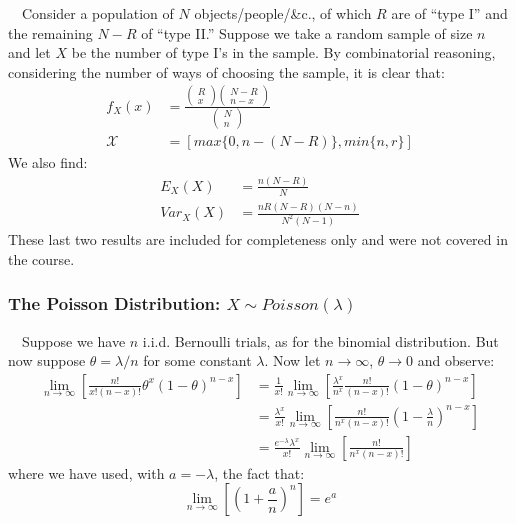 \documentclass[12pt,a4paper]{article}
\begin{document}
$\quad$Consider a population of $N$ objects/people/\&c., of which $R$ are of ``type I'' and the remaining $N-R$ of ``type II.'' Suppose we take a random sample of size $n$ and let $X$ be the number of type I's in the sample. By combinatorial reasoning, considering the number of ways of choosing the sample, it is clear that:
\begin{align*}
f_X(x) &= \frac{\left(\!\!\! \begin{array}{c} R\\ x\end{array}\!\!\!\right) \left(\!\!\!\begin{array}{c} N-R\\ n-x \end{array}\!\!\!\right)}{\left(\!\!\!\begin{array}{c} N\\ n\end{array}\!\!\!\right)}\\
\mathcal{X} &= [max\{0,n-(N-R)\},min\{n,r\}]
\end{align*}
We also find:
\begin{align*}
E_{X}(X) &= \frac{n(N-R)}{N}\\
Var_{X}(X) &= \frac{nR(N-R)(N-n)}{N^2(N-1)}
\end{align*}
These last two results are included for completeness only and were not covered in the course.

\subsubsection{The Poisson Distribution: $X \sim Poisson(\lambda)$}

$\quad$Suppose we have $n$ i.i.d. Bernoulli trials, as for the binomial distribution. But now suppose $\theta = \lambda/n$ for some constant $\lambda$. Now let $n \rightarrow \infty$, $\theta \rightarrow 0$ and observe:
\begin{align*}
\lim_{n \rightarrow \infty} \left[\frac{n!}{x! (n - x)!} \theta^x (1 - \theta)^{n - x}\right] &= \frac{1}{x!}\lim_{n \rightarrow \infty} \left[\frac{\lambda^x}{n^x} \frac{n!}{(n-x)!} (1-\theta)^{n-x}\right]\\
&= \frac{\lambda^x}{x!}\lim_{n\rightarrow\infty}\left[ \frac{n!}{n^x (n-x)!}\left(1 - \frac{\lambda}{n}\right)^{n-x}\right]\\
&= \frac{e^{-\lambda}\lambda^x}{x!}\lim_{n\rightarrow\infty} \left[\frac{n!}{n^x(n-x)!}\right]
\end{align*}
where we have used, with $a = -\lambda$, the fact that:
$$\lim_{n\rightarrow\infty}\left[\left(1+\frac{a}{n}\right)^{n}\right] = e^a$$
\end{document}
